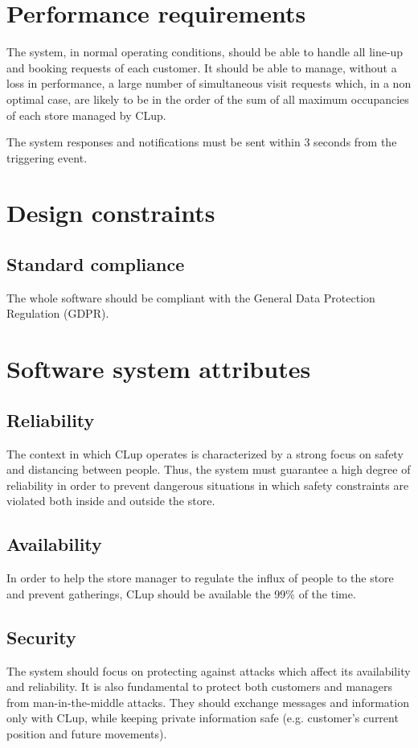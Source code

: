 \documentclass[a4paper,oneside,11pt]{book}   %
\begin{document}
    \section{Performance requirements}
    The system, in normal operating conditions, should be able to handle all line-up and booking requests of each customer. It should be able to manage, without a loss in performance, a large number of simultaneous visit requests which, in a non optimal case, are likely to be in the order of the sum of all maximum occupancies of each store managed by CLup. \par
    The system responses and notifications must be sent within 3 seconds from the triggering event.
    
    \section{Design constraints}
    \subsection{Standard compliance}
    The whole software should be compliant with the General Data Protection Regulation (GDPR).
    
    \section{Software system attributes}
    \subsection{Reliability}
    The context in which CLup operates is characterized by a strong focus on safety and distancing between people. Thus, the system must guarantee a high degree of reliability in order to prevent dangerous situations in which safety constraints are violated both inside and outside the store. 
    
    \subsection{Availability}
    In order to help the store manager to regulate the influx of people to the store and prevent gatherings, CLup should be available the 99\% of the time.
    
    \subsection{Security}
    The system should focus on protecting against attacks which affect its availability and reliability. It is also fundamental to protect both customers and managers from man-in-the-middle attacks. They should exchange messages and information only with CLup, while keeping private information safe (e.g. customer’s current position and future movements).
    
\end{document}
